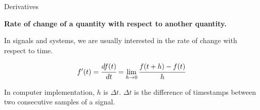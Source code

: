 \documentclass[aspectratio=169,xcolor=dvipsnames,svgnames,x11names,fleqn]{beamer}
\begin{document}

\begin{frame}{Derivatives}

\begin{center}
\bf
    Rate of change of a quantity with respect to another quantity.


\par In signals and systems, we are usually interested in the rate of change with respect to time.

$$
f'(t) = \cfrac{df(t)}{dt} = \lim_{h \to 0}\cfrac{f(t+h) - f(t)}{h}
$$

\begin{gradbox}{}
    In computer implementation, $h$ is $\Delta t$. $\Delta t$ is the difference of timestamps between two consecutive samples of a signal. 
\end{gradbox}
\end{center}
\end{frame}

\end{document}
